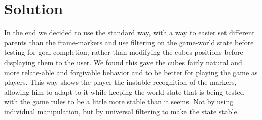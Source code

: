 \section{Solution}
In the end we decided to use the standard way, with a way to easier set different parents than the frame-markers and use filtering on the game-world state before testing for goal completion, rather than modifying the cubes positions before displaying them to the user. We found this gave the cubes fairly natural and more relate-able and forgivable behavior and to be better for playing the game as players. This way shows the player the instable recognition of the markers, allowing him to adapt to it while keeping the world state that is being tested with the game rules to be a little more stable than it seems. Not by using individual manipulation, but by universal filtering to make the state stable.